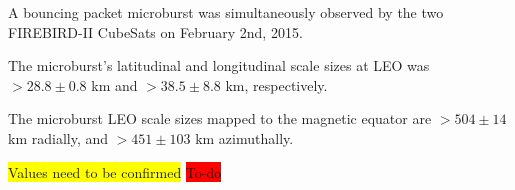 \documentclass[draft,linenumbers]{agujournal}
\begin{document}





\begin{keypoints}
\item A bouncing packet microburst was simultaneously observed by the two FIREBIRD-II CubeSats on February 2nd, 2015.
\item The microburst's latitudinal and longitudinal scale sizes at LEO was $> 28.8 \pm 0.8$ km and $> 38.5 \pm 8.8$ km, respectively.
\item The microburst LEO scale sizes mapped to the magnetic equator are $ >504 \pm​ 14$ km radially, and $> 451 \pm 103$ km azimuthally.
\end{keypoints}

%
%

\colorbox{yellow}{Values need to be confirmed} \colorbox{red}{To-do}
\end{document}
